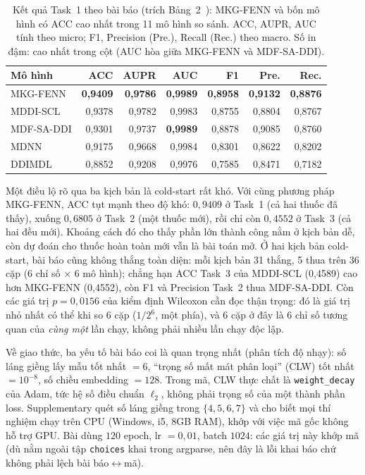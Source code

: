 \documentclass[conference]{IEEEtran}
\begin{document}
\begin{table}[t]
\caption{Kết quả Task~1 theo bài báo (trích Bảng~2~\cite{mkgfenn}): MKG-FENN và bốn mô hình có ACC cao nhất trong 11 mô
hình so sánh. ACC, AUPR, AUC tính theo micro; F1, Precision (Pre.), Recall (Rec.) theo macro. Số in đậm: cao nhất trong cột (AUC hòa
giữa MKG-FENN và MDF-SA-DDI).}
\label{tab:fenn-res}
\centering\footnotesize
\setlength{\tabcolsep}{2.5pt}
\begin{tabular}{lrrrrrr}
\toprule
Mô hình & ACC & AUPR & AUC & F1 & Pre. & Rec. \\
\midrule
MKG-FENN & \textbf{0,9409} & \textbf{0,9786} & \textbf{0,9989} & \textbf{0,8958} & \textbf{0,9132} & \textbf{0,8876} \\
MDDI-SCL     & 0,9378 & 0,9782 & 0,9983 & 0,8755 & 0,8804 & 0,8767 \\
MDF-SA-DDI   & 0,9301 & 0,9737 & \textbf{0,9989} & 0,8878 & 0,9085 & 0,8760 \\
MDNN         & 0,9175 & 0,9668 & 0,9984 & 0,8301 & 0,8622 & 0,8202 \\
DDIMDL       & 0,8852 & 0,9208 & 0,9976 & 0,7585 & 0,8471 & 0,7182 \\
\bottomrule
\end{tabular}
\end{table}

Một điều lộ rõ qua ba kịch bản là cold-start rất khó. Với cùng phương pháp MKG-FENN, ACC tụt mạnh
theo độ khó: $0{,}9409$ ở Task~1 (cả hai thuốc đã thấy), xuống $0{,}6805$ ở Task~2
(một thuốc mới), rồi chỉ còn $0{,}4552$ ở Task~3 (cả hai đều mới). Khoảng cách đó cho
thấy phần lớn thành công nằm ở kịch bản dễ, còn dự đoán cho thuốc hoàn toàn mới vẫn là
bài toán mở. Ở hai kịch bản cold-start, bài báo cũng không thắng toàn diện: mỗi kịch bản 31 thắng,
5 thua trên 36 cặp (6 chỉ số $\times$ 6 mô hình);
chẳng hạn ACC Task~3 của MDDI-SCL (0,4589) cao hơn MKG-FENN (0,4552), còn F1 và Precision Task~2
thua MDF-SA-DDI. Còn các giá trị $p=0{,}0156$ của kiểm định Wilcoxon cần đọc thận trọng: đó là giá
trị nhỏ nhất có thể khi so 6 cặp ($1/2^6$, một phía), và 6 cặp ở đây là 6 chỉ số tương quan của
\emph{cùng một} lần chạy, không phải nhiều lần chạy độc lập.

Về giao thức, ba yếu tố bài báo coi là quan trọng nhất (phân tích độ nhạy): số láng giềng lấy mẫu tốt nhất
$=6$, ``trọng số mất mát phân loại'' (CLW) tốt nhất $=10^{-8}$, số chiều embedding $=128$. Trong mã,
CLW thực chất là \texttt{weight\_decay} của Adam, tức hệ số điều chuẩn $\ell_2$, không phải trọng số
của một thành phần loss. Supplementary quét số láng giềng trong $\{4,5,6,7\}$ và cho biết mọi thí
nghiệm chạy trên CPU (Windows, i5, 8GB RAM), khớp với việc mã gốc không hỗ trợ GPU. Bài dùng $120$
epoch, lr $=0{,}01$, batch $1024$: các giá trị này khớp mã (dù nằm ngoài tập \texttt{choices}
khai trong argparse, nên đây là lỗi khai báo chứ không phải lệch bài báo$\leftrightarrow$mã).
\end{document}
